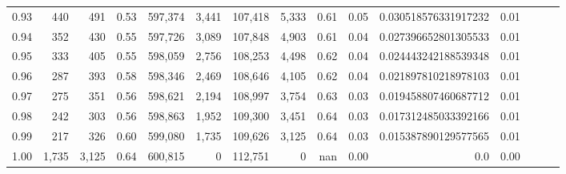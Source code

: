 \begin{tabular}{rrrrrrrrrrrrrrr}
0.93 &     440 &    491 &  0.53 &  597,374 &    3,441 &  107,418 &    5,333 &  0.61 &  0.05 &  0.030518576331917232 &      0.01 \\
0.94 &     352 &    430 &  0.55 &  597,726 &    3,089 &  107,848 &    4,903 &  0.61 &  0.04 &  0.027396652801305533 &      0.01 \\
0.95 &     333 &    405 &  0.55 &  598,059 &    2,756 &  108,253 &    4,498 &  0.62 &  0.04 &  0.024443242188539348 &      0.01 \\
0.96 &     287 &    393 &  0.58 &  598,346 &    2,469 &  108,646 &    4,105 &  0.62 &  0.04 &  0.021897810218978103 &      0.01 \\
0.97 &     275 &    351 &  0.56 &  598,621 &    2,194 &  108,997 &    3,754 &  0.63 &  0.03 &  0.019458807460687712 &      0.01 \\
0.98 &     242 &    303 &  0.56 &  598,863 &    1,952 &  109,300 &    3,451 &  0.64 &  0.03 &  0.017312485033392166 &      0.01 \\
0.99 &     217 &    326 &  0.60 &  599,080 &    1,735 &  109,626 &    3,125 &  0.64 &  0.03 &  0.015387890129577565 &      0.01 \\
1.00 &   1,735 &  3,125 &  0.64 &  600,815 &        0 &  112,751 &        0 &   nan &  0.00 &                   0.0 &      0.00 \\
\bottomrule
\end{tabular}
